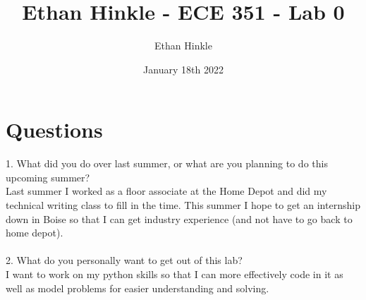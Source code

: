 \documentclass{article}
\title{Ethan Hinkle - ECE 351 - Lab 0}
\author{Ethan Hinkle}
\date{January 18th 2022}
\begin{document}
\maketitle

\section{Questions}

1. What did you do over last summer, or what are you planning to do this upcoming summer?\\
Last summer I worked as a floor associate at the Home Depot and did my technical writing class to fill in the time. This summer I hope to get an internship down in Boise so that I can get industry experience (and not have to go back to home depot).\\
\\
2. What do you personally want to get out of this lab?\\
I want to work on my python skills so that I can more effectively code in it as well as model problems for easier understanding and solving.
\end{document}
